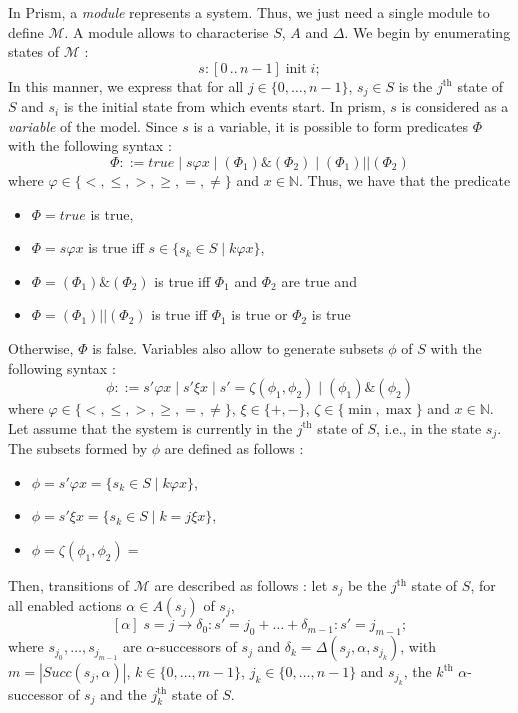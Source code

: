 In Prism, a \textit{module} represents a system. Thus, we just need a single module to
define $\mathcal{M}$. A module allows to characterise $S$, $A$ and $\Delta$. We begin by enumerating states of $\mathcal{M}$ :
\[
  s: [0\, ..\, n-1] \; \text{init} \; i;
\]
In this manner, we express that for all $j \in \{0, \dots, n-1\}$, $s_j \in S$
is the $j^{\text{th}}$ state of $S$ and $s_i$ is the initial state from which events start. In prism, $s$ is considered as a \textit{variable} of the model.
Since $s$ is a variable, it is possible to form predicates $\Phi$ with the following  syntax :
\[ \Phi ::= true \; | \; s \varphi x \; | \; (\Phi_1) \& (\Phi_2) \; | \; (\Phi_1) || (\Phi_2) \]
where $\varphi \in \{<, \leq, >, \geq, =, \neq\}$
and $x \in \mathbb{N}$. Thus, we have that the predicate
\begin{itemize}
  \item $\Phi = true$ is true,
  \item $\Phi = s \varphi x$ is true iff $s \in \{ s_k \in S \; | \; k \varphi x \}$,
  \item $\Phi = (\Phi_1) \& (\Phi_2)$ is true iff
    $\Phi_1$ and $\Phi_2$ are true and
  \item $\Phi = (\Phi_1) || (\Phi_2)$ is true iff $\Phi_1$ is true or $\Phi_2$ is true
\end{itemize}
Otherwise, $\Phi$ is false. Variables also allow to generate subsets $\phi$ of $S$ with the following syntax :
\[
  \phi ::= s' \varphi x \; | \; s' \xi x \; | \; s'=\zeta(\phi_1, \phi_2)
  \; | \; (\phi_1) \& (\phi_2)
\]
where $\varphi \in \{<, \leq, >, \geq, =, \neq\}$,
$\xi \in \{+, -\}$, $\zeta \in \{\min, \max \}$ and $x \in \mathbb{N}$.
Let assume that the system is currently in the $j^\text{th}$ state of $S$, i.e.,
in the state $s_j$. The subsets formed by $\phi$ are defined as follows :
\begin{itemize}
  \item $\phi = s' \varphi x = \{ s_k \in S \; | \; k \varphi x \}$,
  \item $\phi = s' \xi x = \{ s_k \in S \; | \; k = j \xi x \}$,
  \item $\phi = \zeta(\phi_1, \phi_2) = $
\end{itemize}

Then, transitions of $\mathcal{M}$ are described as follows :
let $s_j$ be the $j^{\text{th}}$ state of $S$, for all enabled actions $\alpha \in A(s_j)$ of $s_j$,
\[
  [\alpha] \; s=j \rightarrow \delta_0 : s'=j_0 + \dots + \delta_{m-1} :  s'=j_{m-1};
\]
where $s_{j_0}, \dots, s_{j_{m-1}}$ are $\alpha$-successors of $s_j$ and $\delta_k = \Delta(s_j, \alpha, s_{j_k})$,
with  $m=|Succ(s_j,\alpha)|$, $k \in \{0, \dots, m-1\}$, $j_k \in \{0, \dots, n-1\}$ and $s_{j_k}$, the $k^\text{th}$ $\alpha$-successor of $s_j$ and the $j_k^\text{th}$ state of $S$.

